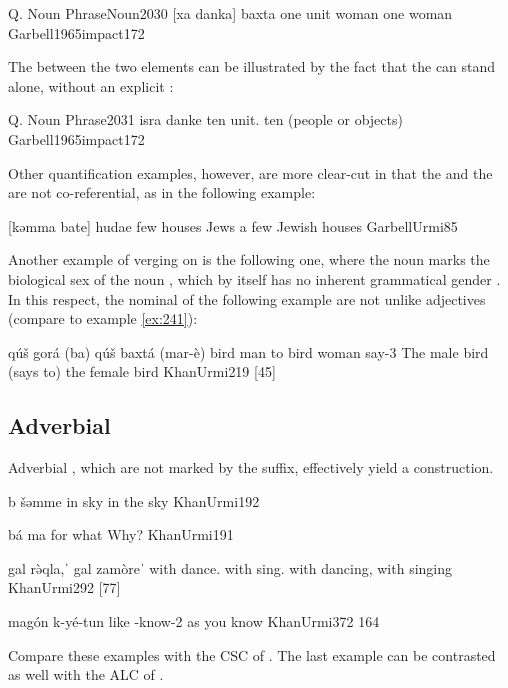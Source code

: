  \acex
 {Q. Noun Phrase}{Noun}{2030}
 {[xa danka] baxta}
 {one unit woman}
 {one woman}
 {Garbell1965impact}{172}
 
 The  between the two elements can be illustrated by the fact that the \prim can stand alone, without an explicit \secn:
 
 \acex
 {Q. Noun Phrase}{\zero}{2031}
 {isra danke}
 {ten unit.\pl}
 {ten (people or objects)}
 {Garbell1965impact}{172}
 
 Other quantification examples, however, are more clear-cut in that the \prim and the \secn are not co-referential, as in the following example:
 
 {[kəmma \parplus bate] hudae}
 {few houses Jews}
 {a few Jewish houses}
 {GarbellUrmi}{85}
 
\largerpage
Another example of  verging on  is the following one, where the \secn noun marks the biological sex of the \prim noun , which by itself has no inherent grammatical gender \citep[see glossary of][569]{KhanUrmi}. In this respect, the nominal \secns of the following example are not unlike adjectives (compare to example \vref{ex:241}):

{qúš gorá (ba\cb{}) qúš baxtá (mar-è)}
{bird man \hphantom{(}to\cb{} bird woman say-3\masc}
{The male bird (says to) the female bird}
{KhanUrmi}{219 {[45]}}
 
\subsection{Adverbial \prims} \label{ss:JUrm_AdverbialHeads}

Adverbial \prims, which are not marked by the \cst* suffix, effectively yield a  construction. 

{b\cb{} šəmme}
{in\cb{} sky}
{in the sky}
{KhanUrmi}{192}

{bá\cb{} ma}
{for\cb{} what}
{Why?}
{KhanUrmi}{191}

{gal\cb{} rə̀qla,ˈ gal\cb{} zamòreˈ}
{with\cb{} dance.\inf{} with\cb{} sing.\inf}
{with dancing, with singing}
{KhanUrmi}{292 {[77]}} 

{magón k-yé-tun}
{like \ind-know-2\pl}
{as you know}
{KhanUrmi}{372 {164}}

Compare these examples with the CSC of . The last example can be contrasted as well with the ALC of .

